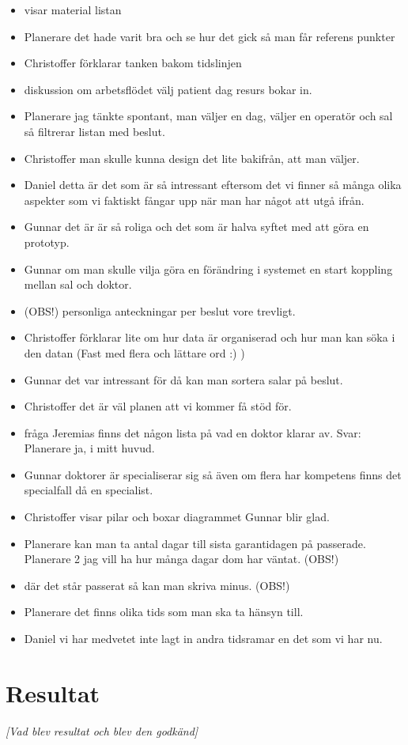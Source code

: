 \documentclass[a4paper,10pt, twoside]{article}
\begin{document}
\begin{itemize}
    \item visar material listan
    \item Planerare det hade varit bra och se hur det gick så man får referens punkter
    \item Christoffer förklarar tanken bakom tidslinjen
    \item diskussion om arbetsflödet välj patient dag resurs bokar in.
    \item Planerare jag tänkte spontant, man väljer en dag, väljer en operatör och sal så filtrerar listan med beslut.
    \item Christoffer man skulle kunna design det lite bakifrån, att man väljer.
    \item Daniel detta är det som är så intressant eftersom det vi finner så många olika aspekter som vi faktiskt fångar upp när man har något att utgå ifrån.
    \item Gunnar det är är så roliga och det som är halva syftet med att göra en prototyp.
    \item Gunnar om man skulle vilja göra en förändring i systemet en start koppling mellan sal och doktor.
    \item (OBS!) personliga anteckningar per beslut vore trevligt.
    \item Christoffer förklarar lite om hur data är organiserad och hur man kan söka i den datan (Fast med flera och lättare ord :) )
    \item Gunnar det var intressant för då kan man sortera salar på beslut.
    \item Christoffer det är väl planen att vi kommer få stöd för.
    \item fråga Jeremias finns det någon lista på vad en doktor klarar av. Svar: Planerare ja, i mitt huvud.
    \item Gunnar doktorer är specialiserar sig så även om flera har kompetens finns det specialfall då en specialist.
    \item Christoffer visar pilar och boxar diagrammet Gunnar blir glad.
    \item Planerare kan man ta antal dagar till sista garantidagen på passerade. Planerare 2 jag vill ha hur många dagar dom har väntat. (OBS!)
    \item där det står passerat så kan man skriva minus. (OBS!)
    \item Planerare det finns olika tids som man ska ta hänsyn till.
    \item Daniel  vi har medvetet inte lagt in andra tidsramar en det som vi har nu.
\end{itemize}

\section{Resultat}
\emph{[Vad blev resultat och blev den godkänd]}
\end{document}
